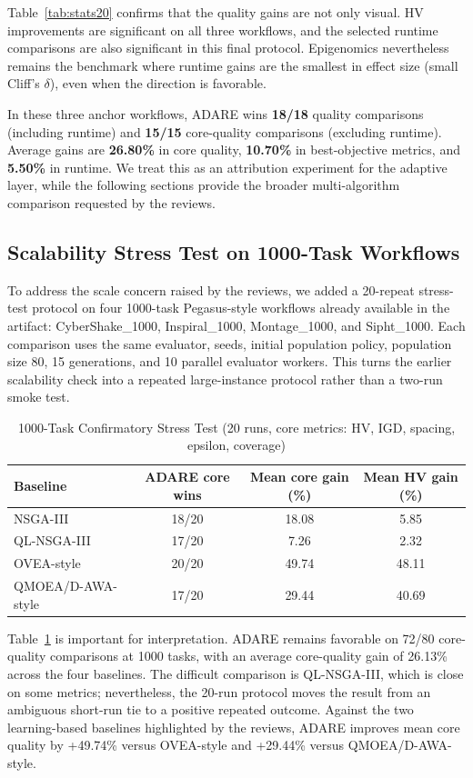 \documentclass[preprint,12pt]{elsarticle}
\begin{document}
Table~\ref{tab:stats20} confirms that the quality gains are not only visual. HV improvements are significant on all three workflows, and the selected runtime comparisons are also significant in this final protocol. Epigenomics nevertheless remains the benchmark where runtime gains are the smallest in effect size (small Cliff's $\delta$), even when the direction is favorable.

In these three anchor workflows, ADARE wins \textbf{18/18} quality comparisons (including runtime) and \textbf{15/15} core-quality comparisons (excluding runtime). Average gains are \textbf{26.80\%} in core quality, \textbf{10.70\%} in best-objective metrics, and \textbf{5.50\%} in runtime. We treat this as an attribution experiment for the adaptive layer, while the following sections provide the broader multi-algorithm comparison requested by the reviews.

\subsection{Scalability Stress Test on 1000-Task Workflows}
To address the scale concern raised by the reviews, we added a 20-repeat stress-test protocol on four 1000-task Pegasus-style workflows already available in the artifact: CyberShake\_1000, Inspiral\_1000, Montage\_1000, and Sipht\_1000. Each comparison uses the same evaluator, seeds, initial population policy, population size 80, 15 generations, and 10 parallel evaluator workers. This turns the earlier scalability check into a repeated large-instance protocol rather than a two-run smoke test.

\begin{table}[H]
\caption{1000-Task Confirmatory Stress Test (20 runs, core metrics: HV, IGD, spacing, epsilon, coverage)}
\label{tab:stress1000}
\centering
\scriptsize
\begin{tabular}{@{}lccc@{}}
\toprule
Baseline & ADARE core wins & Mean core gain (\%) & Mean HV gain (\%) \\
\midrule
NSGA-III & 18/20 & 18.08 & 5.85 \\
QL-NSGA-III & 17/20 & 7.26 & 2.32 \\
OVEA-style & 20/20 & 49.74 & 48.11 \\
QMOEA/D-AWA-style & 17/20 & 29.44 & 40.69 \\
\bottomrule
\end{tabular}
\end{table}

Table~\ref{tab:stress1000} is important for interpretation. ADARE remains favorable on 72/80 core-quality comparisons at 1000 tasks, with an average core-quality gain of 26.13\% across the four baselines. The difficult comparison is QL-NSGA-III, which is close on some metrics; nevertheless, the 20-run protocol moves the result from an ambiguous short-run tie to a positive repeated outcome. Against the two learning-based baselines highlighted by the reviews, ADARE improves mean core quality by +49.74\% versus OVEA-style and +29.44\% versus QMOEA/D-AWA-style.
\end{document}
